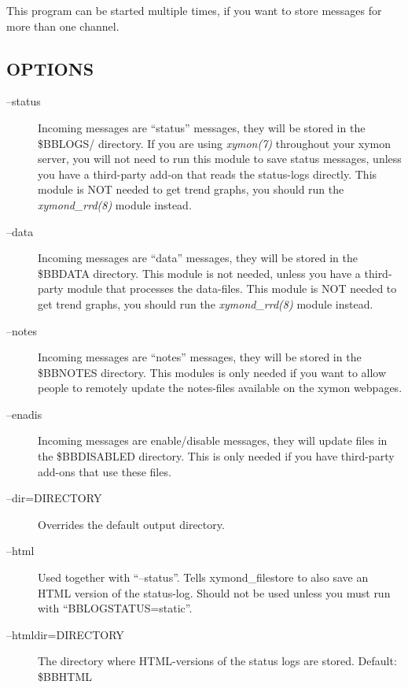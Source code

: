   This program can be started multiple times, if you want to store messages for more than one channel. 


 
\subsection{OPTIONS}
\begin{description}
\item[--status] Incoming messages are ``status'' messages, they will be stored in the \$BBLOGS/ directory. If you are using \emph{xymon(7)}
 throughout your xymon server, you will not need to run this module to save status messages, unless you have a third-party add-on that reads the status-logs directly. This module is NOT needed to get trend graphs, you should run the \emph{xymond\_rrd(8)}
 module instead. 

 

\item[--data] Incoming messages are ``data'' messages, they will be stored in the \$BBDATA directory. This module is not needed, unless you have a third-party module that processes the data-files. This module is NOT needed to get trend graphs, you should run the \emph{xymond\_rrd(8)}
 module instead. 

 

\item[--notes] Incoming messages are ``notes'' messages, they will be stored in the \$BBNOTES directory. This modules is only needed if you want to allow people to remotely update the notes-files available on the xymon webpages. 

 

\item[--enadis] Incoming messages are enable/disable messages, they will update files in the \$BBDISABLED directory. This is only needed if you have third-party add-ons that use these files. 

 

\item[--dir=DIRECTORY] Overrides the default output directory. 

 

\item[--html] Used together with ``--status''. Tells xymond\_filestore to also save an HTML version of the status-log. Should not be used unless you must run with ``BBLOGSTATUS=static''. 

 

\item[--htmldir=DIRECTORY] The directory where HTML-versions of the status logs are stored. Default: \$BBHTML 


\end{description}

